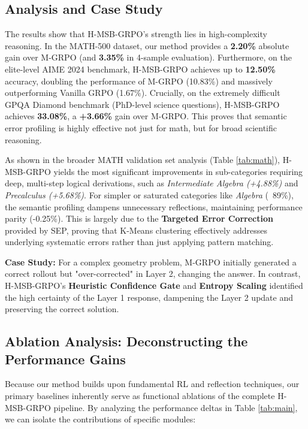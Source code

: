 \documentclass[letterpaper]{article}
\begin{document}
\subsection{Analysis and Case Study}
The results show that H-MSB-GRPO's strength lies in high-complexity reasoning. In the MATH-500 dataset, our method provides a \textbf{2.20\%} absolute gain over M-GRPO (and \textbf{3.35\%} in 4-sample evaluation). Furthermore, on the elite-level AIME 2024 benchmark, H-MSB-GRPO achieves up to \textbf{12.50\%} accuracy, doubling the performance of M-GRPO (10.83\%) and massively outperforming Vanilla GRPO (1.67\%). Crucially, on the extremely difficult GPQA Diamond benchmark (PhD-level science questions), H-MSB-GRPO achieves \textbf{33.08\%}, a \textbf{+3.66\%} gain over M-GRPO. This proves that semantic error profiling is highly effective not just for math, but for broad scientific reasoning.

As shown in the broader MATH validation set analysis (Table \ref{tab:math}), H-MSB-GRPO yields the most significant improvements in sub-categories requiring deep, multi-step logical derivations, such as \textit{Intermediate Algebra (+4.88\%)} and \textit{Precalculus (+5.68\%)}. For simpler or saturated categories like \textit{Algebra} (~89\%), the semantic profiling dampens unnecessary reflections, maintaining performance parity (-0.25\%). This is largely due to the \textbf{Targeted Error Correction} provided by SEP, proving that K-Means clustering effectively addresses underlying systematic errors rather than just applying pattern matching.

\textbf{Case Study:} For a complex geometry problem, M-GRPO initially generated a correct rollout but "over-corrected" in Layer 2, changing the answer. In contrast, H-MSB-GRPO's \textbf{Heuristic Confidence Gate} and \textbf{Entropy Scaling} identified the high certainty of the Layer 1 response, dampening the Layer 2 update and preserving the correct solution.

\subsection{Ablation Analysis: Deconstructing the Performance Gains}
Because our method builds upon fundamental RL and reflection techniques, our primary baselines inherently serve as functional ablations of the complete H-MSB-GRPO pipeline. By analyzing the performance deltas in Table \ref{tab:main}, we can isolate the contributions of specific modules:
\end{document}
